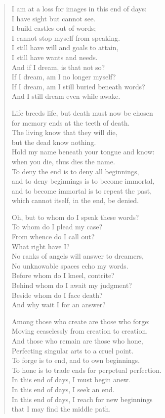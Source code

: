 \begin{verse}
I am at a loss for images in this end of days:\\
I have sight but cannot see.\\
I build castles out of words;\\
I cannot stop myself from speaking.\\
I still have will and goals to attain,\\
I still have wants and needs.\\
And if I dream, is that not so?\\
If I dream, am I no longer myself?\\
If I dream, am I still buried beneath words?\\
And I still dream even while awake.

Life breeds life, but death must now be chosen\\
for memory ends at the teeth of death.\\
The living know that they will die,\\
but the dead know nothing.\\
Hold my name beneath your tongue and know:\\
when you die, thus dies the name.\\
To deny the end is to deny all beginnings,\\
and to deny beginnings is to become immortal,\\
and to become immortal is to repeat the past,\\
which cannot itself, in the end, be denied.

Oh, but to whom do I speak these words?\\
To whom do I plead my case?\\
From whence do I call out?\\
What right have I?\\
No ranks of angels will answer to dreamers,\\
No unknowable spaces echo my words.\\
Before whom do I kneel, contrite?\\
Behind whom do I await my judgment?\\
Beside whom do I face death?\\
And why wait I for an answer?

Among those who create are those who forge:\\
Moving ceaselessly from creation to creation.\\
And those who remain are those who hone,\\
Perfecting singular arts to a cruel point.\\
To forge is to end, and to own beginnings.\\
To hone is to trade ends for perpetual perfection.\\
In this end of days, I must begin anew.\\
In this end of days, I seek an end.\\
In this end of days, I reach for new beginnings\\
that I may find the middle path.


\end{verse}
